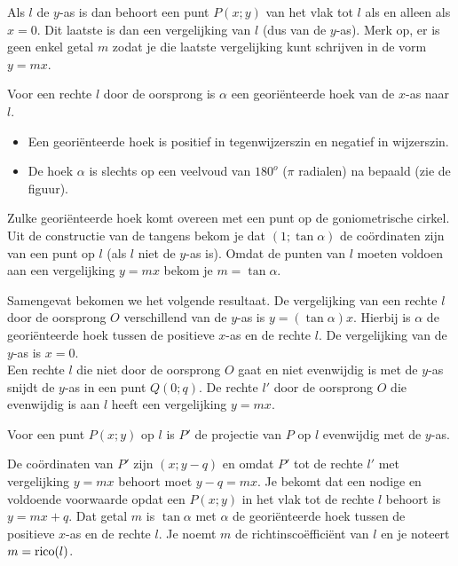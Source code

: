 Als $l$ de $y$-as is dan behoort een punt $P(x;y)$ van het vlak tot $l$ als en alleen als $x=0$.
Dit laatste is dan een vergelijking van $l$ (dus van de $y$-as).
Merk op, er is geen enkel getal $m$ zodat je die laatste vergelijking kunt schrijven in de vorm $y=mx$.

Voor een rechte $l$ door de oorsprong is $\alpha$ een geori\"enteerde hoek van de $x$-as naar $l$.
\begin{itemize}
\item Een geori\"enteerde hoek is positief in tegenwijzerszin en negatief in wijzerszin.
\item De hoek $\alpha$ is slechts op een veelvoud van $180^o$ ($\pi$ radialen) na bepaald (zie de figuur).
\end{itemize}

Zulke geori\"enteerde hoek komt overeen met een punt op de goniometrische cirkel.
Uit de constructie van de tangens bekom je dat $(1; \tan \alpha)$ de co\"ordinaten zijn van een punt op $l$ (als $l$ niet de $y$-as is).
Omdat de punten van $l$ moeten voldoen aan een vergelijking $y=mx$ bekom je $m=\tan \alpha$.

Samengevat bekomen we het volgende resultaat.
De vergelijking van een rechte $l$ door de oorsprong $O$ verschillend van de $y$-as is $y=(\tan \alpha )x$.
Hierbij is $\alpha$ de geori\"enteerde hoek tussen de positieve $x$-as en de rechte $l$.
De vergelijking van de $y$-as is $x=0$.\\

Een rechte $l$ die niet door de oorsprong $O$ gaat en niet evenwijdig is met de $y$-as snijdt de $y$-as in een punt $Q(0;q)$.
De rechte $l'$ door de oorsprong $O$ die evenwijdig is aan $l$ heeft een vergelijking $y=mx$.

Voor een punt $P(x;y)$ op $l$ is $P'$ de projectie van $P$ op $l$ evenwijdig met de $y$-as.


De co\"ordinaten van $P'$ zijn $(x;y-q)$ en omdat $P'$ tot de rechte $l'$ met vergelijking $y=mx$ behoort moet $y-q=mx$.
Je bekomt dat een nodige en voldoende voorwaarde opdat een $P(x;y)$ in het vlak tot de rechte $l$ behoort is $y=mx+q$.
Dat getal $m$ is $\tan \alpha$ met $\alpha$ de geori\"enteerde hoek tussen de positieve $x$-as en de rechte $l$.
Je noemt $m$ de richtinsco\"effici\"ent van $l$ en je noteert $m=\operatorname{rico} (l)$.

